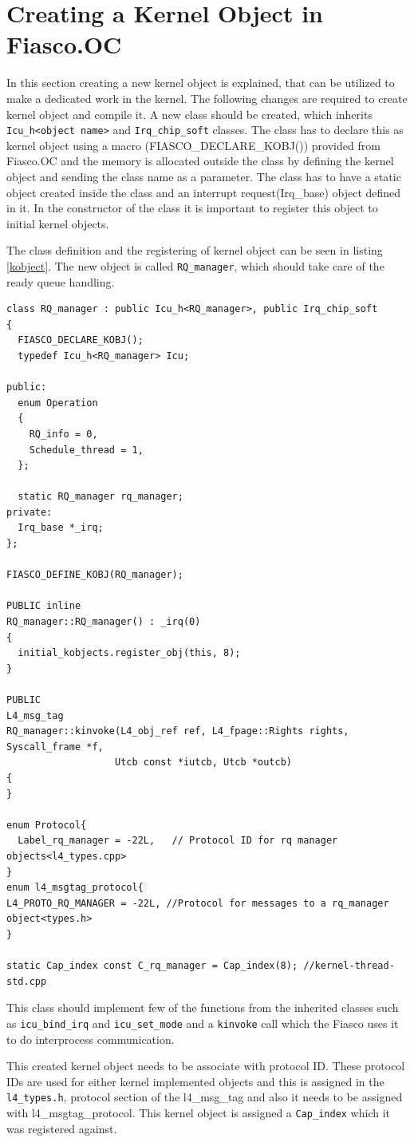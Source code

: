 \section{Creating a Kernel Object in Fiasco.OC}\label{implement:kernelobject}
In this section creating a new kernel object is explained, that can be utilized to make a dedicated work in the kernel. The following changes are required to create kernel object and compile it. A new class should be created, which inherits \texttt{Icu\_h<object name>} and
\texttt{Irq\_chip\_soft} classes. The class has to declare this as kernel object using a macro (FIASCO\_DECLARE\_KOBJ()) provided from Fiasco.OC and the memory is allocated outside the class by defining the kernel object and sending the class name as a parameter. The class has to have a static object created inside the class and an interrupt request(Irq\_base) object defined in it. In the constructor of the class it is important to register this object to initial kernel objects. 

The class definition and the registering of kernel object can be seen in listing \ref{kobject}. The new object is called \texttt{RQ\_manager}, which should take care of the ready queue handling.

\begin{lstlisting}[caption={Creating new kernel object},label=kobject, style=customcpp]
class RQ_manager : public Icu_h<RQ_manager>, public Irq_chip_soft
{
  FIASCO_DECLARE_KOBJ();
  typedef Icu_h<RQ_manager> Icu;

public:
  enum Operation
  {
	RQ_info = 0,
	Schedule_thread = 1,
  };

  static RQ_manager rq_manager;
private:
  Irq_base *_irq;
};

FIASCO_DEFINE_KOBJ(RQ_manager);

PUBLIC inline
RQ_manager::RQ_manager() : _irq(0)
{
  initial_kobjects.register_obj(this, 8);
}

PUBLIC
L4_msg_tag
RQ_manager::kinvoke(L4_obj_ref ref, L4_fpage::Rights rights, Syscall_frame *f,
                   Utcb const *iutcb, Utcb *outcb)
{
}

enum Protocol{
  Label_rq_manager = -22L,   // Protocol ID for rq manager objects<l4_types.cpp>
}
enum l4_msgtag_protocol{
L4_PROTO_RQ_MANAGER = -22L, //Protocol for messages to a rq_manager object<types.h>
}

static Cap_index const C_rq_manager = Cap_index(8); //kernel-thread-std.cpp
\end{lstlisting}

This class should implement few of the functions from the inherited classes such as \texttt{icu\_bind\_irq} and \texttt{icu\_set\_mode} and a \texttt{kinvoke} call which the Fiasco uses it to do interprocess communication.

This created kernel object needs to be associate with protocol ID. These protocol IDs are used for either
kernel implemented objects and this is assigned in the \texttt{l4\_types.h}, protocol section of the
l4\_msg\_tag and also it needs to be assigned with l4\_msgtag\_protocol. This kernel object is assigned a \texttt{Cap\_index} which it was registered against.